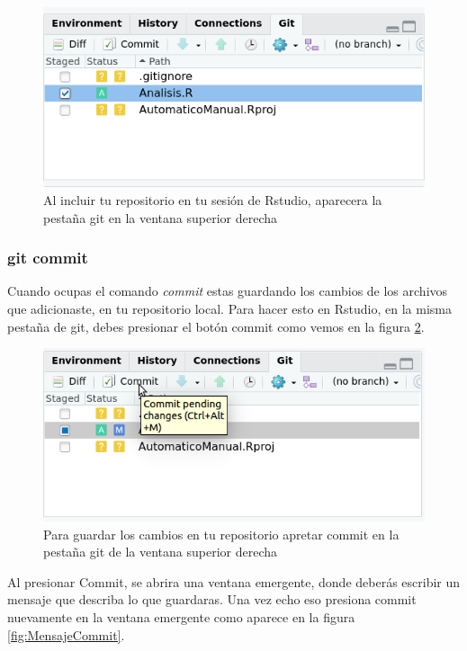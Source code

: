 \documentclass[]{book}
\begin{document}
\begin{figure}

{\centering \includegraphics[width=0.8\linewidth]{GitAdd} 

}

\caption{Al incluir tu repositorio en tu sesión de Rstudio, aparecera la pestaña git en la ventana superior derecha}\label{fig:Add}
\end{figure}

\hypertarget{git-commit}{%
\subsubsection{git commit}\label{git-commit}}

Cuando ocupas el comando \emph{commit} estas guardando los cambios de
los archivos que adicionaste, en tu repositorio local. Para hacer esto
en Rstudio, en la misma pestaña de git, debes presionar el botón commit
como vemos en la figura \ref{fig:Commit}.

\begin{figure}

{\centering \includegraphics[width=0.8\linewidth]{Commit} 

}

\caption{Para guardar los cambios en tu repositorio apretar commit en la pestaña git de la ventana superior derecha}\label{fig:Commit}
\end{figure}

Al presionar Commit, se abrira una ventana emergente, donde deberás
escribir un mensaje que describa lo que guardaras. Una vez echo eso
presiona commit nuevamente en la ventana emergente como aparece en la
figura \ref{fig:MensajeCommit}.
\end{document}
